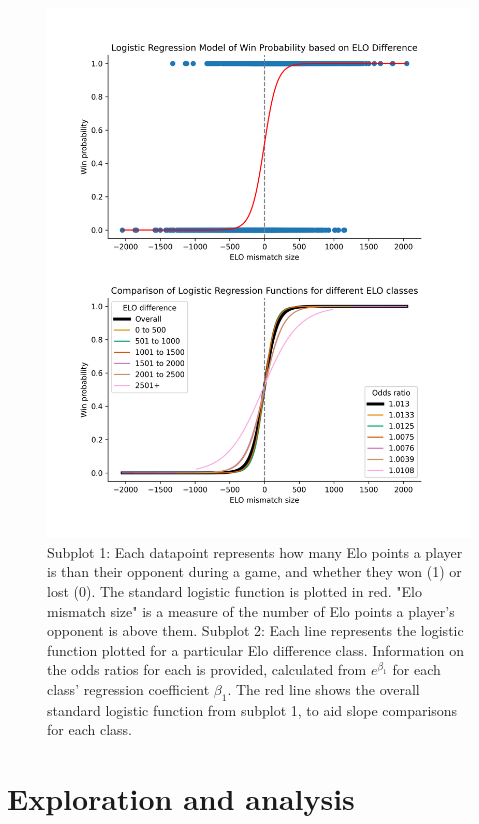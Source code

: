 \documentclass[10pt,a4paper]{article}
\begin{document}
\begin{multicols}{2}
\begin{figure}[p]
  \centering
  \includegraphics[width=\textwidth]{report/images/log_regression_dual.png}
  \caption{Subplot 1: Each datapoint represents how many Elo points a player is than their opponent during a game, and whether they won (1) or lost (0). The standard logistic function is plotted in red. "Elo mismatch size" is a measure of the number of Elo points a player's opponent is above them. \newline \newline  
  Subplot 2: Each line represents the logistic function plotted for a particular Elo difference class. Information on the odds ratios for each is provided, calculated from $e^{\beta_{1}}$ for each class' regression coefficient $\beta_{1}$. The red line shows the overall standard logistic function from subplot 1, to aid slope comparisons for each class.}
  \label{fds-project-template:fig:log_regression}
\end{figure}



\section{Exploration and  analysis}


\end{multicols}
\end{document}
